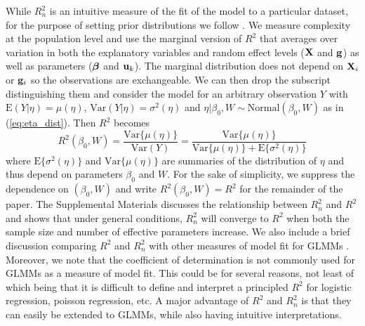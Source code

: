 \documentclass[12pt]{article}
\begin{document}
While $R_n^2$ is an intuitive measure of the fit of the model to a particular dataset, for the purpose of setting prior distributions we follow \cite{zhang2022bayesian}. We measure complexity at the population level and use the marginal version of $R^2$ that averages over variation in both the explanatory variables and random effect levels ($\mbox{\bf X}$ and ${\bf g}$) as well as parameters ($\mbox{\boldmath $\beta$}$ and $\mbox{\bf u}_k$). The marginal distribution does not depend on $\mbox{\bf X}_i$ or ${\bf g}_i$ so the observations are exchangeable. We can then drop the subscript distinguishing them and consider the model for an arbitrary observation $Y$ with $\mbox{E}(Y|\eta)=\mu(\eta)$, $\mbox{Var}(Y|\eta)=\sigma^2(\eta)$ and $\eta|\beta_0,W \sim \mbox{Normal}(\beta_0,W)$ as in (\ref{eq:eta_dist}).  Then $R^2$ becomes
\begin{equation}\label{e:R2_zhang}
   R^2(\beta_0,W) = \frac{\mbox{Var}\{\mu(\eta)\}}{\mbox{Var}(Y)} = \frac{\mbox{Var}\{\mu(\eta)\}}{\mbox{Var}\{\mu(\eta)\}+\mbox{E}\{\sigma^2(\eta)\}}
\end{equation}
where $\mbox{E}\{\sigma^2(\eta)\}$ and $\mbox{Var}\{\mu(\eta)\}$ are summaries of the distribution of $\eta$ and thus depend on parameters $\beta_0$ and $W$. For the sake of simplicity, we suppress the dependence on $(\beta_0,W)$ and write $R^2(\beta_0,W)=R^2$ for the remainder of the paper.
The Supplemental Materials discusses the relationship between $R^2_n$ and $R^2$ and shows that under general conditions, $R_n^2$ will converge to $R^2$ when both the sample size and number of effective parameters increase. We also include a brief discussion comparing $R^2$ and $R^2_n$ with other measures of model fit for GLMMs \citep[e.g.][]{cox1989analysis, mcfadden1973conditional}. Moreover, we note that the coefficient of determination is not commonly used for GLMMs as a measure of model fit. This could be for several reasons, not least of which being that it is difficult to define and interpret a principled $R^2$ for logistic regression, poisson regression, etc. A major advantage of $R^2$ and $R^2_n$ is that they can easily be extended to GLMMs, while also having intuitive interpretations.
\end{document}
